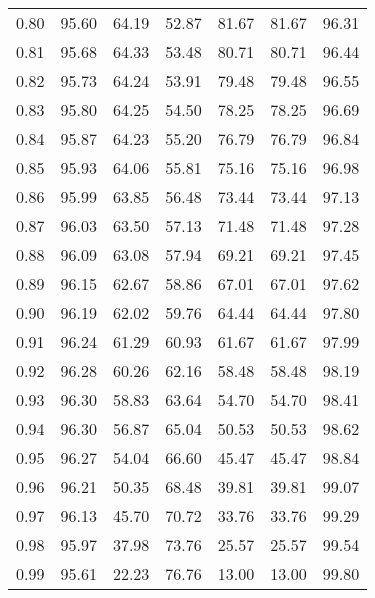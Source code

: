 \begin{tabular}{|c|c|c|c|c|c|c|}
      0.80 &     95.60 &     64.19 &      52.87 &   81.67 &      81.67 &         96.31 \\
      0.81 &     95.68 &     64.33 &      53.48 &   80.71 &      80.71 &         96.44 \\
      0.82 &     95.73 &     64.24 &      53.91 &   79.48 &      79.48 &         96.55 \\
      0.83 &     95.80 &     64.25 &      54.50 &   78.25 &      78.25 &         96.69 \\
      0.84 &     95.87 &     64.23 &      55.20 &   76.79 &      76.79 &         96.84 \\
      0.85 &     95.93 &     64.06 &      55.81 &   75.16 &      75.16 &         96.98 \\
      0.86 &     95.99 &     63.85 &      56.48 &   73.44 &      73.44 &         97.13 \\
      0.87 &     96.03 &     63.50 &      57.13 &   71.48 &      71.48 &         97.28 \\
      0.88 &     96.09 &     63.08 &      57.94 &   69.21 &      69.21 &         97.45 \\
      0.89 &     96.15 &     62.67 &      58.86 &   67.01 &      67.01 &         97.62 \\
      0.90 &     96.19 &     62.02 &      59.76 &   64.44 &      64.44 &         97.80 \\
      0.91 &     96.24 &     61.29 &      60.93 &   61.67 &      61.67 &         97.99 \\
      0.92 &     96.28 &     60.26 &      62.16 &   58.48 &      58.48 &         98.19 \\
      0.93 &     96.30 &     58.83 &      63.64 &   54.70 &      54.70 &         98.41 \\
      0.94 &     96.30 &     56.87 &      65.04 &   50.53 &      50.53 &         98.62 \\
      0.95 &     96.27 &     54.04 &      66.60 &   45.47 &      45.47 &         98.84 \\
      0.96 &     96.21 &     50.35 &      68.48 &   39.81 &      39.81 &         99.07 \\
      0.97 &     96.13 &     45.70 &      70.72 &   33.76 &      33.76 &         99.29 \\
      0.98 &     95.97 &     37.98 &      73.76 &   25.57 &      25.57 &         99.54 \\
      0.99 &     95.61 &     22.23 &      76.76 &   13.00 &      13.00 &         99.80 \\
\bottomrule
\end{tabular}
